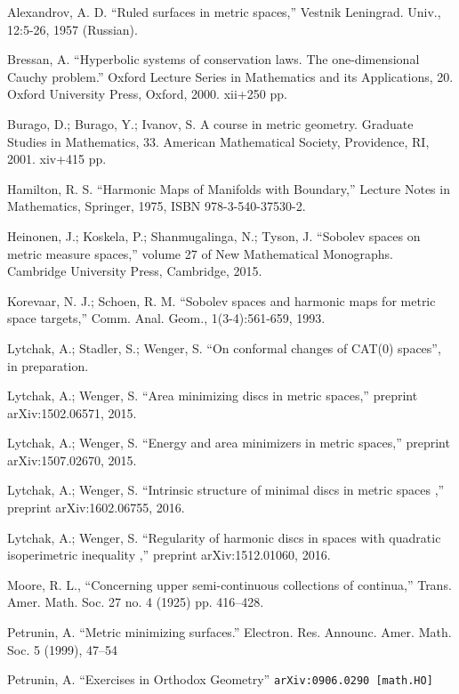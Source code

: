 \documentclass[a4paper,10pt]{amsart}
\begin{document}
\begin{thebibliography}{52}

 Alexandrov, A. D. ``Ruled  surfaces  in  metric  spaces,'' Vestnik Leningrad. Univ., 12:5-26, 1957 (Russian).

 Bressan, A.
``Hyperbolic systems of conservation laws.
The one-dimensional Cauchy problem.'' 
Oxford Lecture Series in Mathematics and its Applications, 20. 
Oxford University Press, Oxford, 2000. 
xii+250 pp.

Burago, D.; Burago, Y.; Ivanov, S.
A course in metric geometry.
Graduate Studies in Mathematics, 33. American Mathematical Society, Providence, RI, 2001. xiv+415 pp.

 Hamilton, R. S. ``Harmonic Maps of Manifolds with Boundary,'' Lecture Notes in Mathematics, Springer, 1975, ISBN 978-3-540-37530-2.

 Heinonen, J.;  Koskela, P.;  Shanmugalinga, N.; Tyson, J. ``Sobolev spaces on metric measure spaces,''
volume 27 of New Mathematical Monographs. Cambridge University Press, Cambridge, 2015.

Korevaar, N. J.; Schoen, R. M. ``Sobolev spaces and harmonic maps for metric space targets,'' Comm. Anal. Geom., 1(3-4):561-659, 1993.

 Lytchak, A.; Stadler, S.; Wenger, S.  ``On conformal changes of CAT(0) spaces'', in preparation.

Lytchak, A.; Wenger, S. ``Area minimizing discs in metric spaces,'' preprint arXiv:1502.06571, 2015.

Lytchak, A.; Wenger, S. ``Energy and area minimizers in metric spaces,'' preprint  arXiv:1507.02670, 2015.

Lytchak, A.; Wenger, S. ``Intrinsic structure of minimal discs in metric spaces ,'' preprint  arXiv:1602.06755, 2016.

Lytchak, A.; Wenger, S. ``Regularity of harmonic discs in spaces with quadratic isoperimetric inequality  ,'' preprint  arXiv:1512.01060, 2016.

Moore, R. L.,
``Concerning upper semi-continuous collections of continua,''
Trans. Amer. Math. Soc. 27 no. 4 (1925) pp. 416--428.

 Petrunin, A.
``Metric minimizing surfaces.''
Electron. Res. Announc. Amer. Math. Soc. 5 (1999), 47--54 

 Petrunin, A. 
``Exercises in Orthodox Geometry''
{\tt arXiv:0906.0290 [math.HO]}


\end{thebibliography}
\end{document}
